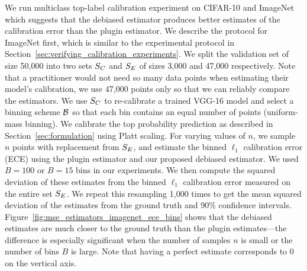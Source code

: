 We run multiclass top-label calibration experiment on CIFAR-10 and ImageNet which suggests that the debiased estimator produces better estimates of the calibration error than the plugin estimator. We describe the protocol for ImageNet first, which is similar to the experimental protocol in Section~\ref{sec:verifying_calibration_experiments}. We split the validation set of size 50,000 into two sets $S_C{}$ and $S_E{}$ of sizes 3,000 and 47,000 respectively. Note that a practitioner would not need so many data points when estimating their model's calibration, we use 47,000 points only so that we can reliably compare the estimators. We use $S_C{}$ to re-calibrate a trained VGG-16 model and select a binning scheme $\mathcal{B}{}$ so that each bin contains an equal number of points (uniform-mass binning). We calibrate the top probability prediction as described in Section~\ref{sec:formulation} using Platt scaling. For varying values of $n$, we sample $n$ points with replacement from $S_E{}$, and estimate the binned $\ell_1$ calibration error (ECE) using the plugin estimator and our proposed debiased estimator. We used $B = 100$ or $B = 15$ bins in our experiments. We then compute the squared deviation of these estimates from the binned $\ell_1$ calibration error measured on the entire set $S_E{}$. We repeat this resampling 1,000 times to get the mean squared deviation of the estimates from the ground truth and 90\% confidence intervals. Figure~\ref{fig:mse_estimators_imagenet_ece_bins} shows that the debiased estimates are much closer to the ground truth than the plugin estimates---the difference is especially significant when the number of samples $n$ is small or the number of bins $B$ is large. Note that having a perfect estimate corresponds to $0$ on the vertical axis.

